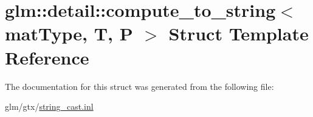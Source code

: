 \hypertarget{structglm_1_1detail_1_1compute__to__string}{\section{glm\-:\-:detail\-:\-:compute\-\_\-to\-\_\-string$<$ mat\-Type, T, P $>$ Struct Template Reference}
\label{structglm_1_1detail_1_1compute__to__string}
}


The documentation for this struct was generated from the following file\-:\begin{DoxyCompactItemize}
\item 
glm/gtx/\hyperlink{string__cast_8inl}{string\-\_\-cast.\-inl}\end{DoxyCompactItemize}
